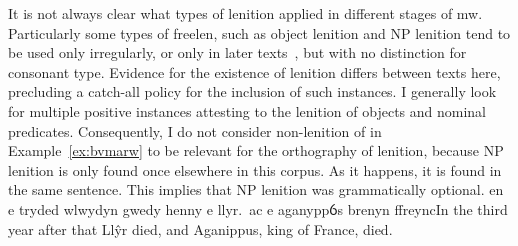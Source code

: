 It is not always clear what types of lenition applied in different
stages of \gls{mw}. Particularly some types of \gls{freelen},
such as object lenition and NP lenition tend to be used only irregularly,
or only in later texts~\autocite{van_sluis_development_2014}, but
with no distinction for consonant type. Evidence for the existence of
lenition differs between texts here, precluding a catch-all policy for
the inclusion of such instances. I generally look for multiple positive
instances attesting to the lenition of objects and nominal predicates.
Consequently, I do not consider non-lenition of  in
Example~\ref{ex:bvmarw} to be relevant for the orthography of lenition,
because NP lenition is only found once elsewhere in this corpus.
As it happens, it is found in the same sentence.
This implies that NP lenition was grammatically optional.
{en e tryded wlwydyn gwedy henny e  llyr.\ ac e  aganyppỽs brenyn ffreync}{In the third year after that Llŷr died, and Aganippus, king of France, died.}


